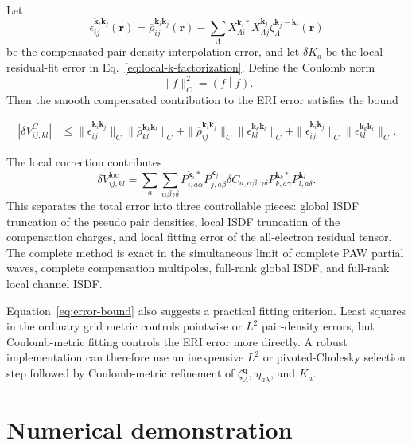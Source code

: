 \documentclass[aps,prb,reprint,superscriptaddress,longbibliography,nofootinbib]{revtex4-2}
\newcommand{\br}{\mathbf r}
\newcommand{\bk}{\mathbf k}
\newcommand{\bq}{\mathbf q}
\newcommand{\coul}[2]{\left(#1\middle|#2\right)}
\newcommand{\loc}{\mathrm{loc}}
\begin{document}
Let
\begin{equation}
\epsilon_{ij}^{\bk_i\bk_j}(\br)
=\overline\rho_{ij}^{\bk_i\bk_j}(\br)
-
\sum_\Lambda X_{\Lambda i}^{\bk_i *}X_{\Lambda j}^{\bk_j}
\zeta_\Lambda^{\bk_j-\bk_i}(\br)
\label{eq:density-error}
\end{equation}
be the compensated pair-density interpolation error, and let \(\delta K_a\) be the local residual-fit error in Eq.~\eqref{eq:local-k-factorization}.  Define the Coulomb norm
\begin{equation}
\|f\|_C^2=\coul{f}{f}.
\label{eq:coulomb-norm}
\end{equation}
Then the smooth compensated contribution to the ERI error satisfies the bound
\begin{widetext}
\begin{align}
|\delta V_{ij,kl}^{C}|
&\le
\|\epsilon_{ij}^{\bk_i\bk_j}\|_C
\|\overline\rho_{kl}^{\bk_k\bk_l}\|_C
+
\|\overline\rho_{ij}^{\bk_i\bk_j}\|_C
\|\epsilon_{kl}^{\bk_k\bk_l}\|_C
+
\|\epsilon_{ij}^{\bk_i\bk_j}\|_C
\|\epsilon_{kl}^{\bk_k\bk_l}\|_C.
\label{eq:error-bound}
\end{align}
\end{widetext}
The local correction contributes
\begin{equation}
\delta V_{ij,kl}^{\loc}
=
\sum_a
\sum_{\alpha\beta\gamma\delta}
P_{i,a\alpha}^{\bk_i *}P_{j,a\beta}^{\bk_j}
\delta C_{a,\alpha\beta,\gamma\delta}
P_{k,a\gamma}^{\bk_k *}P_{l,a\delta}^{\bk_l}.
\label{eq:local-error}
\end{equation}
This separates the total error into three controllable pieces: global ISDF truncation of the pseudo pair densities, local ISDF truncation of the compensation charges, and local fitting error of the all-electron residual tensor.  The complete method is exact in the simultaneous limit of complete PAW partial waves, complete compensation multipoles, full-rank global ISDF, and full-rank local channel ISDF.

Equation~\eqref{eq:error-bound} also suggests a practical fitting criterion.  Least squares in the ordinary grid metric controls pointwise or \(L^2\) pair-density errors, but Coulomb-metric fitting controls the ERI error more directly.  A robust implementation can therefore use an inexpensive \(L^2\) or pivoted-Cholesky selection step followed by Coulomb-metric refinement of \(\zeta_\Lambda^{\bq}\), \(\eta_{a\lambda}\), and \(K_a\).

\section{Numerical demonstration}
\label{sec:numerics}
\end{document}
